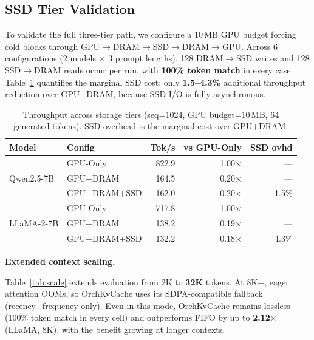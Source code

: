 \documentclass[conference]{IEEEtran}
\begin{document}
\subsection{SSD Tier Validation}
\label{sec:ssd-tier}

To validate the full three-tier path, we configure a 10\,MB GPU budget forcing cold blocks through GPU$\to$DRAM$\to$SSD$\to$DRAM$\to$GPU. Across 6 configurations (2 models $\times$ 3 prompt lengths), 128 DRAM$\to$SSD writes and 128 SSD$\to$DRAM reads occur per run, with \textbf{100\% token match} in every case. Table~\ref{tab:tier-throughput} quantifies the marginal SSD cost: only \textbf{1.5--4.3\%} additional throughput reduction over GPU+DRAM, because SSD I/O is fully asynchronous.

\begin{table}[t]
\centering
\caption{Throughput across storage tiers (seq=1024, GPU budget=10\,MB, 64 generated tokens). SSD overhead is the marginal cost over GPU+DRAM.}
\label{tab:tier-throughput}
\footnotesize
\setlength{\tabcolsep}{4pt}
\begin{tabular}{@{}llrrr@{}}
\toprule
Model & Config & Tok/s & vs GPU-Only & SSD ovhd \\
\midrule
\multirow{3}{*}{Qwen2.5-7B}
& GPU-Only     & 822.9 & 1.00$\times$ & --- \\
& GPU+DRAM     & 164.5 & 0.20$\times$ & --- \\
& GPU+DRAM+SSD & 162.0 & 0.20$\times$ & 1.5\% \\
\midrule
\multirow{3}{*}{LLaMA-2-7B}
& GPU-Only     & 717.8 & 1.00$\times$ & --- \\
& GPU+DRAM     & 138.2 & 0.19$\times$ & --- \\
& GPU+DRAM+SSD & 132.2 & 0.18$\times$ & 4.3\% \\
\bottomrule
\end{tabular}
\end{table}

\textbf{Extended context scaling.}
\label{sec:scale}

Table~\ref{tab:scale} extends evaluation from 2K to \textbf{32K} tokens. At 8K+, eager attention OOMs, so OrchKvCache uses its SDPA-compatible fallback (recency+frequency only). Even in this mode, OrchKvCache remains lossless (100\% token match in every cell) and outperforms FIFO by up to \textbf{2.12$\times$} (LLaMA, 8K), with the benefit growing at longer contexts.
\end{document}
